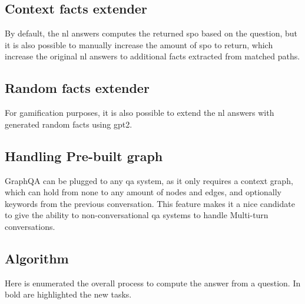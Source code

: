 \subsection{Context facts extender}
By default, the \gls{nl} answers computes the returned \gls{spo} based on the question, but it is also possible to manually increase the amount of \gls{spo} to return, which increase the original \gls{nl} answers to additional facts extracted from matched paths.

\subsection{Random facts extender}
For gamification purposes, it is also possible to extend the \gls{nl} answers with generated random facts using \gls{gpt2}.

\subsection{Handling Pre-built graph}
GraphQA can be plugged to any \gls{qa} system, as it only requires a context graph, which can hold from none to any amount of nodes and edges, and optionally keywords from the previous conversation. This feature makes it a nice candidate to give the ability to non-conversational \gls{qa} systems to handle Multi-turn conversations.

\subsection{Algorithm}
Here is enumerated the overall process to compute the answer from a question. In bold are highlighted the new tasks.

